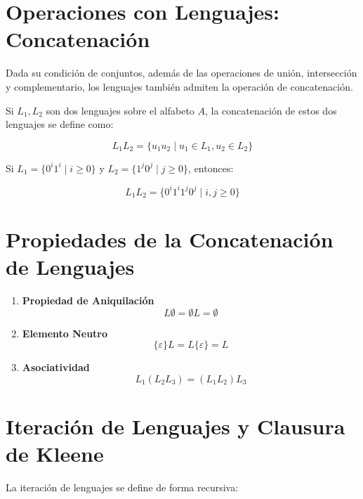 \documentclass[12pt]{report} %
\begin{document}
\hypertarget{operaciones-con-lenguajes-concatenaciuxf3n}{%
\section{Operaciones con Lenguajes:
Concatenación}\label{operaciones-con-lenguajes-concatenaciuxf3n}}

Dada su condición de conjuntos, además de las operaciones de unión,
intersección y complementario, los lenguajes también admiten la
operación de concatenación.

Si \(L_1, L_2\) son dos lenguajes sobre el alfabeto \(A\), la
concatenación de estos dos lenguajes se define como:

\[
L_1L_2 = \{u_1u_2 \mid u_1 \in L_1, u_2 \in L_2\}
\]

\begin{ejemplo}
Si $L_1 = \{0^i1^i \mid i \geq 0\}$ y $L_2 = \{1^j0^j \mid j \geq 0\}$, entonces:

$$
L_1L_2 = \{0^i1^i1^j0^j \mid i, j \geq 0\}
$$
\end{ejemplo}

\hypertarget{propiedades-de-la-concatenaciuxf3n-de-lenguajes}{%
\section{Propiedades de la Concatenación de
Lenguajes}\label{propiedades-de-la-concatenaciuxf3n-de-lenguajes}}

\begin{enumerate}
\def\labelenumi{\arabic{enumi}.}
\item
  \textbf{Propiedad de Aniquilación}\\
  \[L \emptyset = \emptyset L = \emptyset\]
\item
  \textbf{Elemento Neutro}\\
  \[\{\varepsilon\}L = L\{\varepsilon\} = L\]
\item
  \textbf{Asociatividad}\\
  \[L_1(L_2L_3) = (L_1L_2)L_3\]
\end{enumerate}

\hypertarget{iteraciuxf3n-de-lenguajes-y-clausura-de-kleene}{%
\section{Iteración de Lenguajes y Clausura de
Kleene}\label{iteraciuxf3n-de-lenguajes-y-clausura-de-kleene}}

La iteración de lenguajes se define de forma recursiva:
\end{document}
